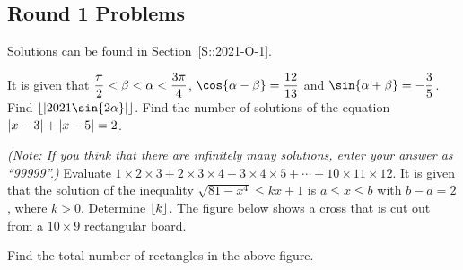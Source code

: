 \subsection{Round 1 Problems}

Solutions can be found in Section~\ref{S::2021-O-1}.

\begin{enumerate}
    \hyperrefitem[A::2021-O-1-1] It is given that $\dfrac\pi2 < \beta < \alpha < \dfrac{3\pi}{4}$, $\cos{\a - \b} = \dfrac{12}{13}$ and $\sin{\a + \b} = -\dfrac35$. Find $\floor{\abs{2021\sin{2\a}}}$.
    \hyperrefitem[A::2021-O-1-2] Find the number of solutions of the equation $\left\lvert x - 3 \right\rvert + \left\lvert x - 5 \right\rvert = 2$.

    \textit{(Note: If you think that there are infinitely many solutions, enter your answer as ``99999''.)}
    \hyperrefitem[A::2021-O-1-3] Evaluate $1 \times 2 \times 3 + 2 \times 3 \times 4 + 3 \times 4 \times 5 + \cdots + 10 \times 11 \times 12$.
    \hyperrefitem[A::2021-O-1-4] It is given that the solution of the inequality $\sqrt{81 - x^4} \leq kx + 1$ is $a \leq x \leq b$ with $b - a = 2$, where $k > 0$. Determine $\left\lfloor k \right\rfloor$.
    \hyperrefitem[A::2021-O-1-5] The figure below shows a cross that is cut out from a $10 \times 9$ rectangular board.

    \begin{center}
    \end{center}
    
    Find the total number of rectangles in the above figure.


\end{enumerate}
